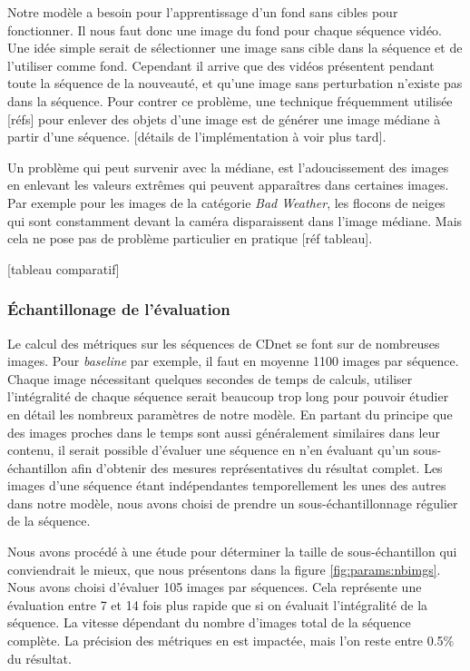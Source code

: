 	Notre modèle a besoin pour l'apprentissage d'un fond sans cibles pour fonctionner. Il nous faut donc une image du fond pour chaque séquence vidéo. Une idée simple serait de sélectionner une image sans cible dans la séquence et de l'utiliser comme fond. Cependant il arrive que des vidéos présentent pendant toute la séquence de la nouveauté, et qu'une image sans perturbation n'existe pas dans la séquence. Pour contrer ce problème, une technique fréquemment utilisée [réfs] pour enlever des objets d'une image est de générer une image médiane à partir d'une séquence. [détails de l'implémentation à voir plus tard].

	Un problème qui peut survenir avec la médiane, est l'adoucissement des images en enlevant les valeurs extrêmes qui peuvent apparaîtres dans certaines images. Par exemple pour les images de la catégorie \textit{Bad Weather}, les flocons de neiges qui sont constamment devant la caméra disparaissent dans l'image médiane. Mais cela ne pose pas de problème particulier en pratique [réf tableau].

	[tableau comparatif]
	
	\subsubsection{Échantillonage de l'évaluation}

	Le calcul des métriques sur les séquences de CDnet se font sur de nombreuses images. Pour \textit{baseline} par exemple, il faut en moyenne 1100 images par séquence. Chaque image nécessitant quelques secondes de temps de calculs, utiliser l'intégralité de chaque séquence serait beaucoup trop long pour pouvoir étudier en détail les nombreux paramètres de notre modèle. En partant du principe que des images proches dans le temps sont aussi généralement similaires dans leur contenu, il serait possible d'évaluer une séquence en n'en évaluant qu'un sous-échantillon afin d'obtenir des mesures représentatives du résultat complet. Les images d'une séquence étant indépendantes temporellement les unes des autres dans notre modèle, nous avons choisi de prendre un sous-échantillonnage régulier de la séquence.
	
	Nous avons procédé à une étude pour déterminer la taille de sous-échantillon qui conviendrait le mieux, que nous présentons dans la figure \ref{fig:params:nbimgs}. Nous avons choisi d'évaluer 105 images par séquences. Cela représente une évaluation entre 7 et 14 fois plus rapide que si on évaluait l'intégralité de la séquence. La vitesse dépendant du nombre d'images total de la séquence complète. La précision des métriques en est impactée, mais l'on reste entre 0.5\% du résultat.

